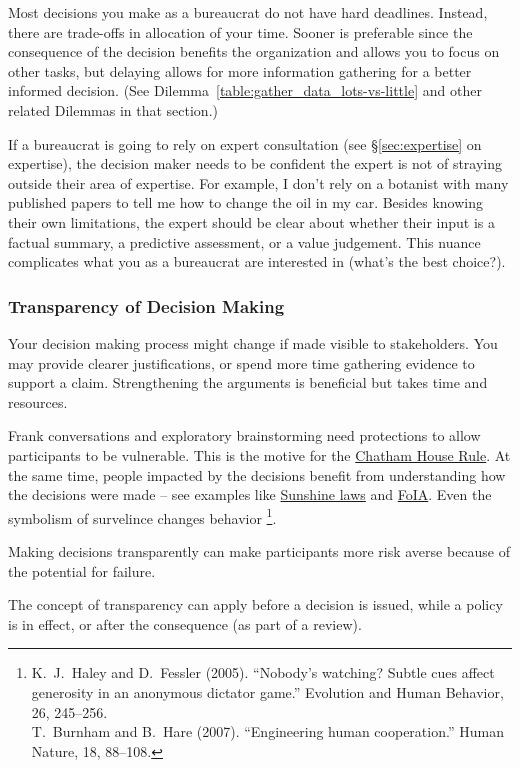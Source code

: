 Most decisions you make as a bureaucrat do not have hard deadlines. Instead, there are trade-offs in allocation of your time. Sooner is preferable since the consequence of the decision benefits the organization and allows you to focus on other tasks, but delaying allows for more information gathering for a better informed decision. (See Dilemma~\ref{table:gather_data_lots-vs-little} and other related Dilemmas in that section.)


If a bureaucrat is going to rely on expert consultation (see \S\ref{sec:expertise} on expertise), the decision maker needs to be confident the expert is not of straying outside their area of expertise. For example, I don't rely on a botanist with many published papers to tell me how to change the oil in my car. 
Besides knowing their own limitations, the expert should be clear about whether their input is a factual summary, a predictive assessment, or a value judgement. This nuance complicates what you as a bureaucrat are interested in (what's the best choice?).


\subsubsection{Transparency of Decision Making\label{sec:transparency-of-decisions}}

Your decision making process might change if made visible to stakeholders. You may provide clearer justifications, or spend more time gathering evidence to support a claim. Strengthening the arguments is beneficial but takes time and resources. 

Frank conversations and exploratory brainstorming need protections to allow participants to be vulnerable. This is the motive for the \href{https://en.wikipedia.org/wiki/Chatham_House_Rule}{Chatham House Rule}. At the same time, people impacted by the decisions benefit from understanding how the decisions were made -- see examples like 
\href{https://en.wikipedia.org/wiki/Government_in_the_Sunshine_Act}{Sunshine laws} and \href{https://en.wikipedia.org/wiki/Freedom_of_Information_Act_(United_States)}{FoIA}. Even the symbolism of survelince changes behavior
\footnote{K.~J.~Haley and D.~Fessler (2005). ``Nobody’s watching? Subtle cues affect generosity in an anonymous dictator game.'' Evolution and Human Behavior, 26, 245–256.\\
T.~Burnham and B.~Hare (2007). ``Engineering human cooperation.'' Human Nature, 18, 88–108.}.

Making decisions transparently can make participants more risk averse because of the potential for failure. 

The concept of transparency can apply before a decision is issued, while a policy is in effect, or after the consequence (as part of a review). 